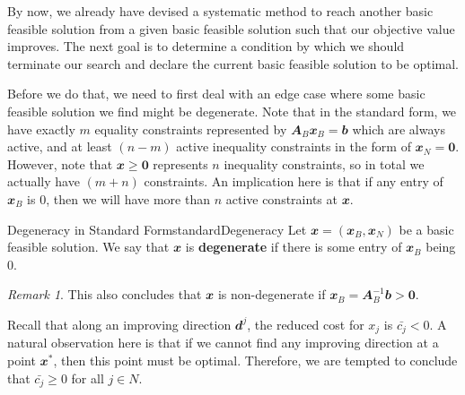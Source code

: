 \documentclass[math, code]{amznotes}
\theoremstyle{remark}
\newtheorem*{remark}{Remark}
\begin{document}
By now, we already have devised a systematic method to reach another basic feasible solution from a given basic feasible solution such that our objective value improves. The next goal is to determine a condition by which we should terminate our search and declare the current basic feasible solution to be optimal.

Before we do that, we need to first deal with an edge case where some basic feasible solution we find might be degenerate. Note that in the standard form, we have exactly $m$ equality constraints represented by $\mathbfit{A}_B\mathbfit{x}_B = \mathbfit{b}$ which are always active, and at least $(n - m)$ active inequality constraints in the form of $\mathbfit{x}_N = \mathbf{0}$. However, note that $\mathbfit{x} \geq \mathbf{0}$ represents $n$ inequality constraints, so in total we actually have $(m + n)$ constraints. An implication here is that if any entry of $\mathbfit{x}_B$ is $0$, then we will have more than $n$ active constraints at $\mathbfit{x}$.
\begin{dfnbox}{Degeneracy in Standard Form}{standardDegeneracy}
    Let $\mathbfit{x} = \left(\mathbfit{x}_B, \mathbfit{x}_N\right)$ be a basic feasible solution. We say that $\mathbfit{x}$ is {\color{red} \textbf{degenerate}} if there is some entry of $\mathbfit{x}_B$ being $0$.
\end{dfnbox}
\begin{notebox}
    \begin{remark}
        This also concludes that $\mathbfit{x}$ is non-degenerate if $\mathbfit{x}_B = \mathbfit{A}_B^{-1}\mathbfit{b} > \mathbf{0}$.
    \end{remark}
\end{notebox}
Recall that along an improving direction $\mathbfit{d}^j$, the reduced cost for $x_j$ is $\bar{c_j} < 0$. A natural observation here is that if we cannot find any improving direction at a point $\mathbfit{x}^*$, then this point must be optimal. Therefore, we are tempted to conclude that $\bar{c_j} \geq 0$ for all $j \in N$.
\end{document}
